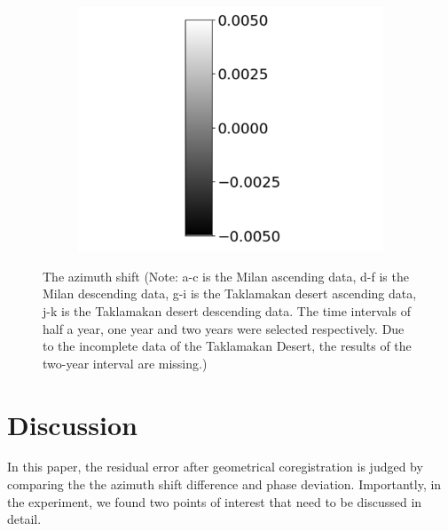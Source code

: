 \documentclass[a4paper,fleqn]{cas-sc}
\begin{document}
\begin{figure}
\begin{subfigure}{0.3\textwidth}
        \centering
        \includegraphics[width=\textwidth]{figure/The azimuth shift/colorbar.png}
        \caption*{}
    \end{subfigure}
    \caption{The azimuth shift (Note: a-c is the Milan ascending data, d-f is the Milan descending data, g-i is the Taklamakan desert ascending data, j-k is the Taklamakan desert descending data. The time intervals of half a year, one year and two years were selected respectively. Due to the incomplete data of the Taklamakan Desert, the results of the two-year interval are missing.)}
    \label{fig_7}
\end{figure}


\section{Discussion}

In this paper, the residual error after geometrical coregistration is judged by comparing the the azimuth shift difference and phase deviation. Importantly, in the experiment, we found two points of interest that need to be discussed in detail. \par
\end{document}

